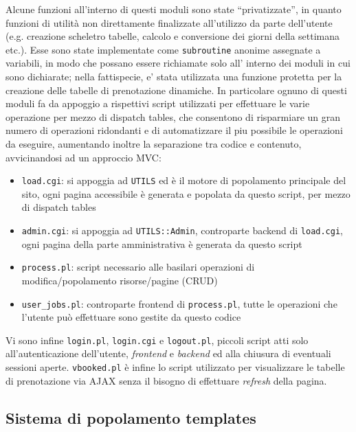 Alcune funzioni all'interno di questi moduli sono state ``privatizzate'', in quanto funzioni di utilità non direttamente finalizzate all'utilizzo da parte dell'utente (e.g. creazione scheletro tabelle, calcolo e conversione dei giorni della settimana etc.). Esse sono state implementate come \texttt{subroutine} anonime assegnate a variabili, in modo che possano essere richiamate solo all' interno dei moduli in cui sono dichiarate; nella fattispecie, e' stata utilizzata una funzione protetta per la creazione delle tabelle di prenotazione dinamiche. 
In particolare ognuno di questi moduli fa da appoggio a rispettivi script utilizzati per effettuare le varie operazione per mezzo di dispatch tables, che consentono di risparmiare un gran numero di operazioni ridondanti e di automatizzare il piu possibile le operazioni da eseguire, aumentando inoltre la separazione tra codice e contenuto, avvicinandosi ad un approccio MVC:

\begin{itemize}

  \item \texttt{load.cgi}: si appoggia ad \texttt{UTILS} ed è il motore di popolamento principale del sito, ogni pagina accessibile è generata e popolata da questo script, per mezzo di dispatch tables
  \item \texttt{admin.cgi}: si appoggia ad \texttt{UTILS::Admin}, controparte backend di \texttt{load.cgi}, ogni pagina della parte amministrativa è generata da questo script
  \item \texttt{process.pl}: script necessario alle basilari operazioni di modifica/popolamento risorse/pagine (CRUD)
  \item \texttt{user\_jobs.pl}: controparte frontend di \texttt{process.pl}, tutte le operazioni che l'utente può effettuare sono gestite da questo codice
\end{itemize}

Vi sono infine \texttt{login.pl}, \texttt{login.cgi} e \texttt{logout.pl}, piccoli script atti solo all'autenticazione dell'utente, \textit{frontend} e \textit{backend} ed alla chiusura di eventuali sessioni aperte.
\texttt{vbooked.pl} è infine lo script utilizzato per visualizzare le tabelle di prenotazione via AJAX senza il bisogno di effettuare \textit{refresh} della pagina.


\subsection{Sistema di popolamento templates}

